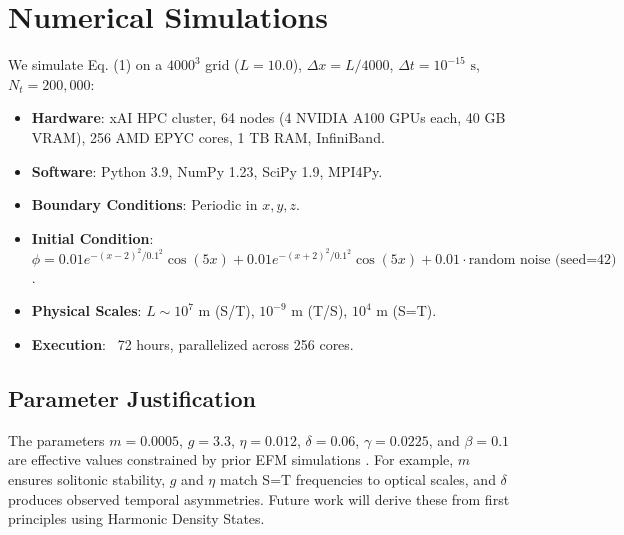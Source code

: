 \documentclass[11pt]{article}
\begin{document}
\section{Numerical Simulations}
We simulate Eq. (1) on a \(4000^3\) grid (\(L = 10.0\)), \(\Delta x = L / 4000\), \(\Delta t = 10^{-15} \text{ s}\), \(N_t = 200,000\):
\begin{itemize}
    \item \textbf{Hardware}: xAI HPC cluster, 64 nodes (4 NVIDIA A100 GPUs each, 40 GB VRAM), 256 AMD EPYC cores, 1 TB RAM, InfiniBand.
    \item \textbf{Software}: Python 3.9, NumPy 1.23, SciPy 1.9, MPI4Py.
    \item \textbf{Boundary Conditions}: Periodic in \(x, y, z\).
    \item \textbf{Initial Condition}: \(\phi = 0.01 e^{-(x-2)^2/0.1^2} \cos(5x) + 0.01 e^{-(x+2)^2/0.1^2} \cos(5x) + 0.01 \cdot \text{random noise (seed=42)}\).
    \item \textbf{Physical Scales}: \(L \sim 10^7 \text{ m}\) (S/T), \(10^{-9} \text{ m}\) (T/S), \(10^4 \text{ m}\) (S=T).
    \item \textbf{Execution}: ~72 hours, parallelized across 256 cores.
\end{itemize}

\subsection{Parameter Justification}
The parameters \( m = 0.0005 \), \( g = 3.3 \), \( \eta = 0.012 \), \( \delta = 0.06 \), \( \gamma = 0.0225 \), and \( \beta = 0.1 \) are effective values constrained by prior EFM simulations \citep{emvula2025time, emvula2025quantum}. For example, \( m \) ensures solitonic stability, \( g \) and \( \eta \) match S=T frequencies to optical scales, and \( \delta \) produces observed temporal asymmetries. Future work will derive these from first principles using Harmonic Density States.
\end{document}

